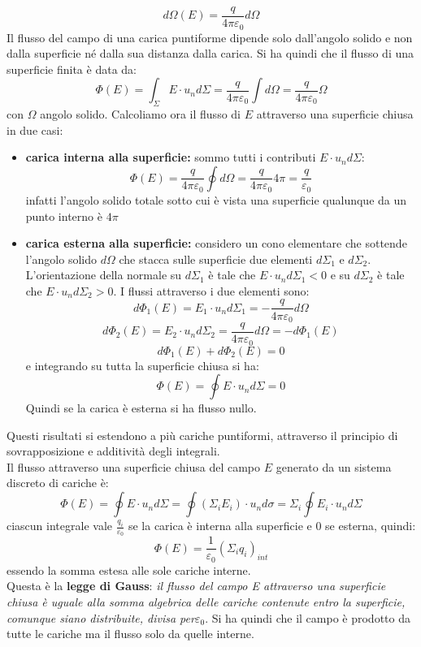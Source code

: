 \documentclass[a4paper,12pt, oneside]{book}
\begin{document}
$$d\Omega(E)=\frac{q}{4\pi\varepsilon_0}d\Omega$$
Il flusso del campo di una carica puntiforme dipende solo dall'angolo solido e non dalla superficie né dalla sua distanza dalla carica. Si ha quindi che il flusso di una superficie finita è data da:
$$\Phi(E)=\int_\Sigma E\cdot u_nd\Sigma=\frac{q}{4\pi\varepsilon_0}\int d\Omega=\frac{q}{4\pi\varepsilon_0}\Omega$$
con $\Omega$ angolo solido. Calcoliamo ora il flusso di $E$ attraverso una superficie chiusa in due casi:
\begin{itemize}
\item \textbf{carica interna alla superficie:} sommo tutti i contributi $E\cdot u_nd\Sigma$:
$$\Phi(E)=\frac{q}{4\pi\varepsilon_0}\oint d\Omega=\frac{q}{4\pi\varepsilon_0}4\pi=\frac{q}{\varepsilon_0}$$
infatti l'angolo solido totale sotto cui è vista una superficie qualunque da un punto interno è $4\pi$
\item \textbf{carica esterna alla superficie:} considero un cono elementare che sottende l'angolo solido $d\Omega$ che stacca sulle superficie due elementi $d\Sigma_1$ e $d\Sigma_2$. L'orientazione della normale su $d\Sigma_1$ è tale che $E\cdot u_nd\Sigma_1<0$ e su $d\Sigma_2$ è tale che $E\cdot u_nd\Sigma_2>0$. I flussi attraverso i due elementi sono:
$$d\Phi_1(E)=E_1\cdot u_nd\Sigma_1=-\frac{q}{4\pi\varepsilon_0}d\Omega$$
$$d\Phi_2(E)=E_2\cdot u_nd\Sigma_2=\frac{q}{4\pi\varepsilon_0}d\Omega=-d\Phi_1(E)$$
$$d\Phi_1(E)+d\Phi_2(E)=0$$
e integrando su tutta la superficie chiusa si ha:
$$\Phi(E)=\oint E\cdot u_nd\Sigma=0$$
Quindi se la carica è esterna si ha flusso nullo.\\
\end{itemize}
Questi risultati si estendono a più cariche puntiformi, attraverso il principio di sovrapposizione e additività degli integrali.\\
Il flusso attraverso una superficie chiusa del campo $E$ generato da un sistema discreto di cariche è:
$$\Phi(E)=\oint E\cdot u_nd\Sigma=\oint (\Sigma_iE_i)\cdot u_nd\sigma=\Sigma_i\oint E_i\cdot u_nd\Sigma$$
ciascun integrale vale $\frac{q_i}{\varepsilon_0}$ se la carica è interna alla superficie e 0 se esterna, quindi:
$$\Phi(E)=\frac{1}{\varepsilon_0}(\Sigma_iq_i)_{int}$$
essendo la somma estesa alle sole cariche interne.\\
Questa è la \textbf{legge di Gauss}: \textit{il flusso del campo E attraverso una superficie chiusa è uguale alla somma algebrica delle cariche contenute entro la superficie, comunque siano distribuite, divisa per}$\varepsilon_0$. Si ha quindi che il campo è prodotto da tutte le cariche ma il flusso solo da quelle interne.\\
\end{document}
